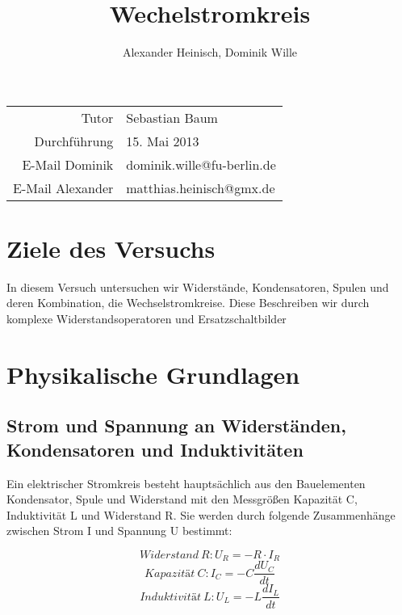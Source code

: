 \documentclass{article}
\title{Wechelstromkreis}
\author{Alexander Heinisch, Dominik Wille}
\begin{document}
\maketitle
\vspace{13cm}
\noindent
\begin{center}
\begin{tabular}{r l}
Tutor & Sebastian Baum  \\
Durchführung & 15. Mai 2013 \\

E-Mail Dominik & dominik.wille@fu-berlin.de \\
E-Mail Alexander & matthias.heinisch@gmx.de \\
\end{tabular}
\end{center}

\newpage
\tableofcontents
\newpage

\section{Ziele des Versuchs}
In diesem Versuch untersuchen wir Widerstände, Kondensatoren, Spulen und deren Kombination, die Wechselstromkreise. Diese Beschreiben wir durch komplexe Widerstandsoperatoren und Ersatzschaltbilder

\section{Physikalische Grundlagen}
\subsection{Strom und Spannung an Widerständen, Kondensatoren und Induktivitäten}
Ein elektrischer Stromkreis besteht hauptsächlich aus den Bauelementen Kondensator, Spule und Widerstand mit den Messgrößen Kapazität C, Induktivität L und Widerstand R. Sie werden durch folgende Zusammenhänge zwischen Strom I und Spannung U bestimmt:

\begin{equation}
\label{1}
Widerstand\ R: U_{R}=-R\cdot I_{R}
\end{equation}
\begin{equation}
\label{2}
Kapazität\ C: I_C=-C\frac{dU_C}{dt}
\end{equation}
\begin{equation}
\label{3}
Induktivität\ L: U_{L}=-L\frac{dI_{L}}{dt}
\end{equation}
\end{document}
